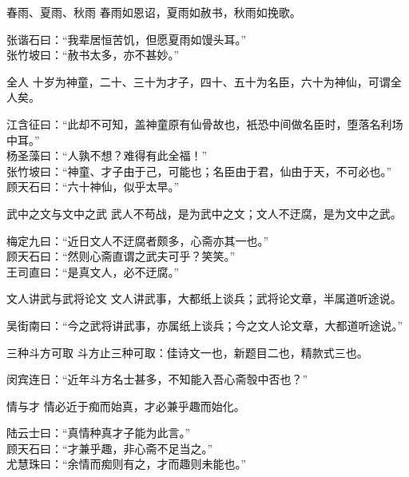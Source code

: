 \begin{yulu}{春雨、夏雨、秋雨}
春雨如恩诏，夏雨如赦书，秋雨如挽歌。
\begin{comments}
张谐石曰：“我辈居恒苦饥，但愿夏雨如馒头耳。” \\
张竹坡曰：“赦书太多，亦不甚妙。”
\end{comments}
\end{yulu}

\begin{yulu}{全人}
十岁为神童，二十、三十为才子，四十、五十为名臣，六十为神仙，可谓全人矣。
\begin{comments}
江含征曰：“此却不可知，盖神童原有仙骨故也，衹恐中间做名臣时，堕落名利场中耳。” \\
杨圣藻曰：“人孰不想？难得有此全福！” \\
张竹坡曰：“神童、才子由于己，可能也；名臣由于君，仙由于天，不可必也。” \\
顾天石曰：“六十神仙，似乎太早。”
\end{comments}
\end{yulu}

\begin{yulu}{武中之文与文中之武}
武人不苟战，是为武中之文；文人不迂腐，是为文中之武。
\begin{comments}
梅定九曰：“近日文人不迂腐者颇多，心斋亦其一也。” \\
顾天石曰：“然则心斋直谓之武夫可乎？笑笑。” \\
王司直曰：“是真文人，必不迂腐。”
\end{comments}
\end{yulu}

\begin{yulu}{文人讲武与武将论文}
文人讲武事，大都纸上谈兵；武将论文章，半属道听途说。
\begin{comments}
吴街南曰：“今之武将讲武事，亦属纸上谈兵；今之文人论文章，大都道听途说。”
\end{comments}
\end{yulu}

\begin{yulu}{三种斗方可取}
斗方止三种可取：佳诗文一也，新题目二也，精款式三也。
\begin{comments}
闵宾连日：“近年斗方名士甚多，不知能入吾心斋彀中否也？”
\end{comments}
\end{yulu}

\begin{yulu}{情与才}
情必近于痴而始真，才必兼乎趣而始化。
\begin{comments}
陆云士曰：“真情种真才子能为此言。” \\
顾天石曰：“才兼乎趣，非心斋不足当之。” \\
尤慧珠曰：“余情而痴则有之，才而趣则未能也。”
\end{comments}
\end{yulu}

